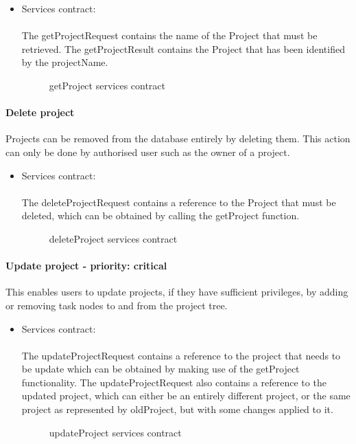 \begin{itemize}
	\item Services contract:\\ \\
	The getProjectRequest contains the name of the Project that must be retrieved. The getProjectResult contains the Project that has been identified by the projectName.
	\begin{figure}[H]
    	\centering
    	\caption{getProject services contract}
    	\label{fig:getProject_services_contract}
   	\end{figure}
\end{itemize}

\paragraph{Delete project}
Projects can be removed from the database entirely by deleting them. This action can only be done by authorised user such as the owner of a project.

\begin{itemize}
	\item Services contract:\\ \\
	The deleteProjectRequest contains a reference to the Project that must be deleted, which can be obtained by calling the getProject function.
	\begin{figure}[H]
    	\centering
    	\caption{deleteProject services contract}
    	\label{fig:deleteProject_services_contract}
   	\end{figure}
\end{itemize}


\paragraph{Update project - priority: critical}
This enables users to update projects, if they have sufficient privileges, by adding or removing task nodes to and from the project tree.

\begin{itemize}
	\item Services contract:\\ \\
	The updateProjectRequest contains a reference to the project that needs to be update which can be obtained by making use of the getProject functionality. The updateProjectRequest also contains a reference to the updated project, which can either be an entirely different project, or the same project as represented by oldProject, but with some changes applied to it.
	\begin{figure}[H]
    	\centering
    	\caption{updateProject services contract}
    	\label{fig:updateProject_services_contract}
   	\end{figure}
\end{itemize}

